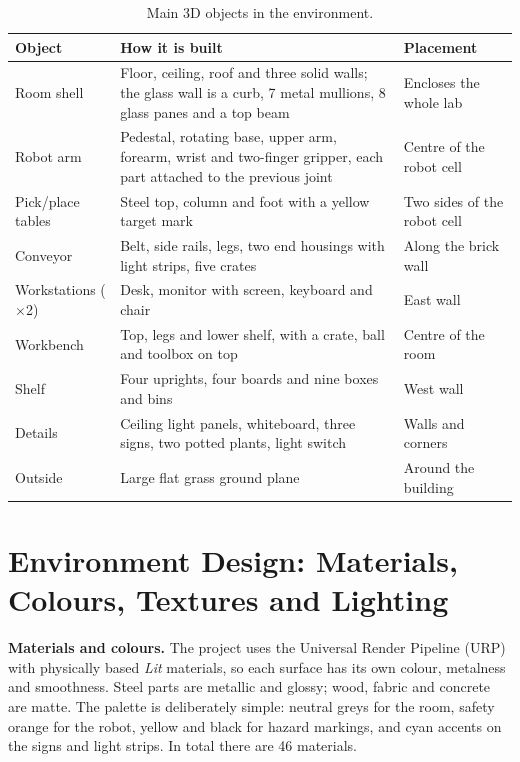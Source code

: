 \documentclass[11pt,a4paper]{article}
\begin{document}
\begin{table}[h]
\centering\small
\begin{tabularx}{\textwidth}{@{}p{3.1cm}Lp{3.3cm}@{}}
\toprule
\textbf{Object} & \textbf{How it is built} & \textbf{Placement} \\
\midrule
Room shell & Floor, ceiling, roof and three solid walls; the glass wall is a curb, 7 metal mullions, 8 glass panes and a top beam & Encloses the whole lab \\
Robot arm & Pedestal, rotating base, upper arm, forearm, wrist and two-finger gripper, each part attached to the previous joint & Centre of the robot cell \\
Pick/place tables & Steel top, column and foot with a yellow target mark & Two sides of the robot cell \\
Conveyor & Belt, side rails, legs, two end housings with light strips, five crates & Along the brick wall \\
Workstations ($\times$2) & Desk, monitor with screen, keyboard and chair & East wall \\
Workbench & Top, legs and lower shelf, with a crate, ball and toolbox on top & Centre of the room \\
Shelf & Four uprights, four boards and nine boxes and bins & West wall \\
Details & Ceiling light panels, whiteboard, three signs, two potted plants, light switch & Walls and corners \\
Outside & Large flat grass ground plane & Around the building \\
\bottomrule
\end{tabularx}
\caption{Main 3D objects in the environment.}
\end{table}

\section{Environment Design: Materials, Colours, Textures and Lighting}

\textbf{Materials and colours.} The project uses the Universal Render Pipeline (URP) with physically based
\emph{Lit} materials, so each surface has its own colour, metalness and smoothness. Steel parts are metallic
and glossy; wood, fabric and concrete are matte. The palette is deliberately simple: neutral greys for the
room, safety orange for the robot, yellow and black for hazard markings, and cyan accents on the signs and
light strips. In total there are 46 materials.
\end{document}
